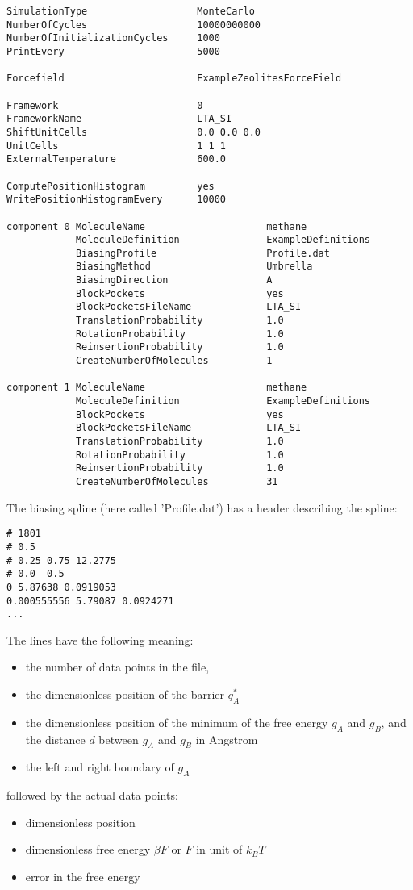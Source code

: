 \begin{tiny}
\begin{verbatim}
SimulationType                   MonteCarlo
NumberOfCycles                   10000000000
NumberOfInitializationCycles     1000
PrintEvery                       5000

Forcefield                       ExampleZeolitesForceField

Framework                        0
FrameworkName                    LTA_SI
ShiftUnitCells                   0.0 0.0 0.0
UnitCells                        1 1 1
ExternalTemperature              600.0

ComputePositionHistogram         yes
WritePositionHistogramEvery      10000

component 0 MoleculeName                     methane
            MoleculeDefinition               ExampleDefinitions
            BiasingProfile                   Profile.dat
            BiasingMethod                    Umbrella
            BiasingDirection                 A
            BlockPockets                     yes
            BlockPocketsFileName             LTA_SI
            TranslationProbability           1.0
            RotationProbability              1.0
            ReinsertionProbability           1.0
            CreateNumberOfMolecules          1

component 1 MoleculeName                     methane
            MoleculeDefinition               ExampleDefinitions
            BlockPockets                     yes
            BlockPocketsFileName             LTA_SI
            TranslationProbability           1.0
            RotationProbability              1.0
            ReinsertionProbability           1.0
            CreateNumberOfMolecules          31
\end{verbatim}
\end{tiny}

The biasing spline (here called 'Profile.dat') has a header describing the spline:
\begin{tiny}
\begin{verbatim}
# 1801
# 0.5
# 0.25 0.75 12.2775
# 0.0  0.5
0 5.87638 0.0919053
0.000555556 5.79087 0.0924271
...
\end{verbatim}
\end{tiny}
The lines have the following meaning:
\begin{itemize}
\item{the number of data points in the file},
\item{the dimensionless position of the barrier $q^*_A$}
\item{the dimensionless position of the minimum of the free energy $g_A$ and $g_B$, and the distance $d$ between $g_A$ and $g_B$ in Angstrom}
\item{the left and right boundary of $g_A$}
\end{itemize}
followed by the actual data points:
\begin{itemize}
\item{dimensionless position}
\item{dimensionless free energy $\beta F$ or $F$ in unit of $k_BT$}
\item{error in the free energy}
\end{itemize}


